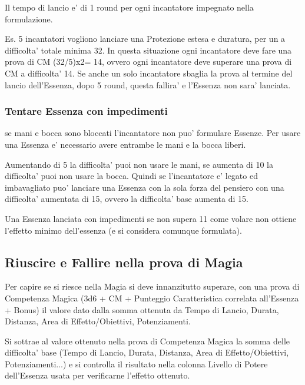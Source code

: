 \documentclass[a4paper,11pt,twoside,openany]{dndbook}
\begin{document}
Il tempo di lancio e' di 1 round per ogni incantatore impegnato nella formulazione.

Es. 5 incantatori vogliono lanciare una Protezione estesa e duratura, per un a difficolta' totale minima 32. In questa situazione ogni incantatore deve fare una prova di CM (32/5)x2= 14, ovvero ogni incantatore deve superare una prova di CM a difficolta' 14. Se anche un solo incantatore sbaglia la prova al termine del lancio dell'Essenza, dopo 5 round, questa fallira' e l'Essenza non sara' lanciata.

\subsubsection{Tentare Essenza con impedimenti}

se mani e bocca sono bloccati l'incantatore non puo' formulare Essenze. Per usare una Essenza e' necessario avere entrambe le mani e la bocca liberi.

Aumentando di 5 la difficolta' puoi non usare le mani, se aumenta di 10 la difficolta' puoi non usare la bocca. Quindi se l'incantatore e' legato ed imbavagliato puo' lanciare una Essenza con la sola forza del pensiero con una difficolta' aumentata di 15, ovvero la difficolta' base aumenta di 15.

Una Essenza lanciata con impedimenti se non supera 11 come volare non ottiene l'effetto minimo dell'essenza (e si considera comunque formulata).

\subsection{Riuscire e Fallire nella prova di Magia}

\label{riuscire-e-fallire-nella-prova-di-magia}

Per capire se si riesce nella Magia si deve innanzitutto superare, con una prova di Competenza Magica (3d6 + CM + Punteggio Caratteristica correlata all'Essenza + Bonus) il valore dato dalla somma ottenuta da Tempo di Lancio, Durata, Distanza, Area di Effetto/Obiettivi, Potenziamenti.

Si sottrae al valore ottenuto nella prova di Competenza Magica la somma delle difficolta' base (Tempo di Lancio, Durata, Distanza, Area di Effetto/Obiettivi, Potenziamenti...) e si controlla il risultato nella colonna Livello di Potere dell'Essenza usata per verificarne l'effetto ottenuto.
\end{document}

